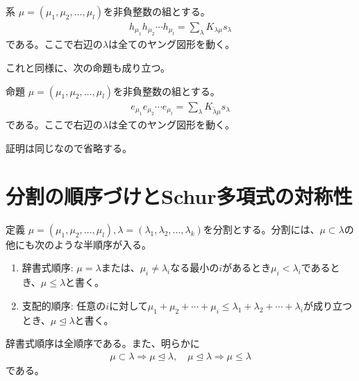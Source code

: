 \documentclass[a4paper,11pt]{jsarticle}
\theoremstyle{plain}
\theoremstyle{definition}
\renewcommand{\(}{\left(}
\renewcommand{\)}{\right)}
\renewcommand{\[}{\left[}
\renewcommand{\]}{\right]}
\renewcommand{\{}{\left\lbrace}
\renewcommand{\}}{\right\rbrace}
\newcommand{\To}{\Longrightarrow}
\begin{document}
\begin{itembox}[l]{系}
    $\mu = (\mu_1, \mu_2, \ldots, \mu_l)$を非負整数の組とする。
    \begin{align*}
        h_{\mu_1}h_{\mu_2}\cdots h_{\mu_l} = \sum_{\lambda} K_{\lambda \mu} s_{\lambda}
    \end{align*}
    である。ここで右辺の$\lambda$は全てのヤング図形を動く。
\end{itembox}

これと同様に、次の命題も成り立つ。

\begin{itembox}[l]{命題}
    $\mu = (\mu_1, \mu_2, \ldots, \mu_l)$を非負整数の組とする。
    \begin{align*}
        e_{\mu_1}e_{\mu_2}\cdots e_{\mu_l} = \sum_{\lambda} K_{\tilde{\lambda} \mu} s_{\lambda}
    \end{align*}
    である。ここで右辺の$\lambda$は全てのヤング図形を動く。
\end{itembox}

証明は同じなので省略する。



\newpage
\section{分割の順序づけとSchur多項式の対称性}


\begin{itembox}[l]{定義}
    $\mu = (\mu_1, \mu_2, \ldots, \mu_l), \lambda = (\lambda_1, \lambda_2, \ldots, \lambda_k)$を分割とする。分割には、$\mu \subset \lambda$の他にも次のような半順序が入る。
    \begin{enumerate}
        \item 辞書式順序: $\mu = \lambda$または、$\mu_i \neq \lambda_i$なる最小の$i$があるとき$\mu_i < \lambda_i$であるとき、$\mu \leq \lambda$と書く。
        \item 支配的順序: 任意の$i$に対して$\mu_1 + \mu_2 + \cdots + \mu_i \leq \lambda_1 + \lambda_2 + \cdots + \lambda_i$が成り立つとき、$\mu \trianglelefteq \lambda$と書く。
    \end{enumerate}
\end{itembox}

辞書式順序は全順序である。また、明らかに
\begin{align*}
    \mu \subset \lambda \To \mu \trianglelefteq \lambda, \quad \mu \trianglelefteq \lambda \To \mu \leq \lambda
\end{align*}
である。
\end{document}
